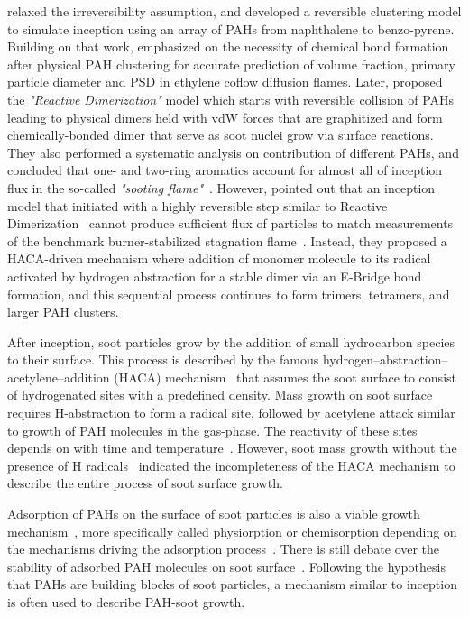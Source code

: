 \citet{eaves2015importance} relaxed the irreversibility assumption, and developed a reversible clustering model to simulate inception using an array of PAHs from naphthalene to benzo-pyrene. Building on that work, \citet{kholghy2019role} emphasized on the necessity of chemical bond formation after physical PAH clustering for accurate prediction of volume fraction, primary particle diameter and PSD in ethylene coflow diffusion flames. Later, \citet{kholghy2018reactive} proposed the \textit{"Reactive Dimerization"} model which starts with reversible collision of PAHs leading to physical dimers held with vdW forces that are graphitized and form chemically-bonded dimer that serve as soot nuclei grow via surface reactions. They also performed a systematic analysis on contribution of different PAHs, and concluded that one- and two-ring aromatics account for almost all of inception flux in the so-called \textit{"sooting flame"}~\citep{desgroux2017comparative}. However, \citet{frenklach2020mechanism} pointed out that an inception model that initiated with a highly reversible step similar to Reactive Dimerization~\citep{kholghy2018reactive} cannot produce sufficient flux of particles to match measurements of the benchmark burner-stabilized stagnation flame~\citep{abid2009quantitative}. Instead, they proposed a HACA-driven mechanism where addition of monomer molecule to its radical activated by hydrogen abstraction for a stable dimer via an E-Bridge bond formation, and this sequential process continues to form trimers, tetramers, and larger PAH clusters.

After inception, soot particles grow by the addition of small hydrocarbon species to their surface. This process is described by
the famous hydrogen–abstraction–acetylene–addition (HACA)
mechanism~\citep{frenklach1991detailed, appel2000kinetic}  that assumes the soot surface to consist of hydrogenated sites with a predefined density. Mass growth on soot surface requires H-abstraction to form a radical
site, followed by acetylene attack similar to growth of PAH molecules in the gas-phase. The reactivity of these sites depends on with time and temperature~\citep{woods1991soot, dasch1985decay}. However, soot mass growth without the presence of H radicals~\citep{singh2006numerical} indicated the incompleteness of the HACA mechanism to
describe the entire process of soot surface growth.

Adsorption of PAHs on the surface of soot particles is also a viable growth mechanism~\citep{frenklach1991detailed}, more specifically called physiorption or chemisorption depending on the mechanisms driving the adsorption process~\citep{michelsen2020review}. There is still debate over the stability of adsorbed PAH molecules on soot surface~\citep{obolensky2007interplay}. Following the hypothesis that PAHs are building blocks of soot particles, a mechanism similar to inception is often used to describe  PAH-soot growth.

